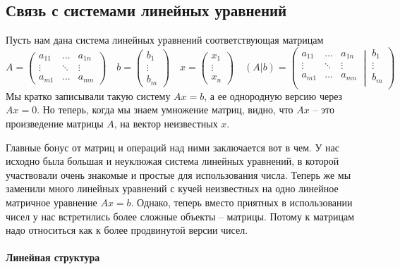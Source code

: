 \subsection{Связь с системами линейных уравнений}

Пусть нам дана система линейных уравнений соответствующая матрицам
\[
A= 
\begin{pmatrix}
a_{11}&\ldots& a_{1n}\\
\vdots&\ddots&\vdots\\
a_{m1}& \ldots &a_{mn}
\end{pmatrix}\quad
b = 
\begin{pmatrix}
b_1\\
\vdots\\
b_m
\end{pmatrix} \quad
x =
\begin{pmatrix}
x_1\\
\vdots\\
x_n
\end{pmatrix}\quad
(A|b) =
\left(\left.
\begin{matrix}
a_{11}&\ldots&a_{1n}\\
\vdots&\ddots&\vdots\\
a_{m1}&\ldots&a_{mn}\\
\end{matrix}
\:\right|\:
\begin{matrix}
b_1\\
\vdots\\
b_m\\
\end{matrix}\right)
\]
Мы кратко записывали такую систему $Ax = b$, а ее однородную версию через $Ax = 0$.
Но теперь, когда мы знаем умножение матриц, видно, что $Ax$ -- это произведение матрицы $A$, на вектор неизвестных $x$.

Главные бонус от матриц и операций над ними заключается вот в чем.
У нас исходно была большая и неуклюжая система линейных уравнений, в которой участвовали очень знакомые и простые для использования числа.
Теперь же мы заменили много линейных уравнений с кучей неизвестных на одно линейное матричное уравнение $Ax = b$.
Однако, теперь вместо приятных в использовании чисел у нас встретились более сложные объекты -- матрицы.
Потому к матрицам надо относиться как к более продвинутой версии чисел.

\paragraph{Линейная структура}

